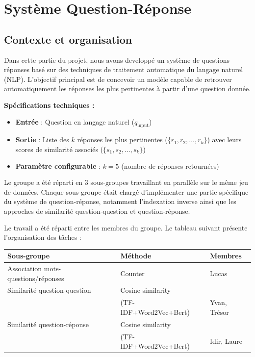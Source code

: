 \documentclass[12pt,a4paper]{report}
\begin{document}
\chapter{Système Question-Réponse}

\section{Contexte et organisation}

Dans cette partie du projet, nous avons developpé un système de questions réponses
basé sur des techniques de traitement automatique du langage naturel (NLP). L'objectif principal est de concevoir un modèle capable de retrouver automatiquement les réponses les plus pertinentes à partir d'une question donnée.

\textbf{Spécifications techniques :}
\begin{itemize}
    \item \textbf{Entrée} : Question en langage naturel ($q_{\text{input}}$)
    \item \textbf{Sortie} : Liste des $k$ réponses les plus pertinentes ($\{r_1, r_2, \ldots, r_k\}$) avec leurs scores de similarité associés ($\{s_1, s_2, \ldots, s_k\}$)
    \item \textbf{Paramètre configurable} : $k = 5$ (nombre de réponses retournées)
\end{itemize}

Le groupe a été réparti en 3 sous-groupes travaillant en parallèle sur le même jeu de données. Chaque sous-groupe était chargé d'implémenter une partie spécifique du système de question-réponse, notamment l'indexation inverse ainsi que les approches de similarité question-question et question-réponse.

Le travail a été réparti entre les membres du groupe. Le tableau suivant présente l'organisation des tâches :

\begin{center}
\begin{tabular}{lll}
\toprule
\textbf{Sous-groupe} & \textbf{Méthode} & \textbf{Membres} \\
\midrule
Association mots-questions/réponses & Counter                               & Lucas \\
\midrule
Similarité question-question    & Cosine similarity & \\
             & (TF-IDF+Word2Vec+Bert) & Yvan, Trésor \\
\midrule
Similarité question-réponse    & Cosine similarity & \\
             & (TF-IDF+Word2Vec+Bert) & Idir, Laure \\
\bottomrule
\end{tabular}
\end{center}
\end{document}
